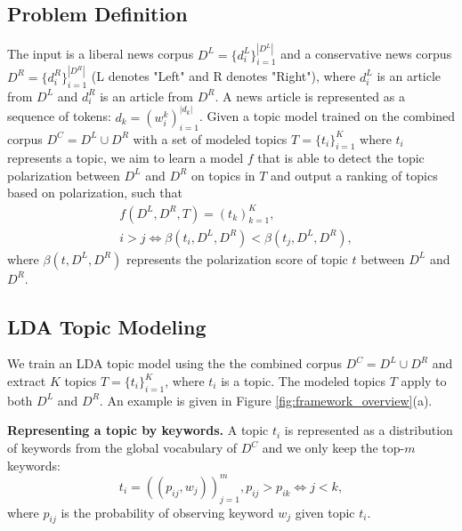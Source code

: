 \documentclass[11pt]{article}
\begin{document}
\subsection{Problem Definition}
The input is a liberal news corpus $D^L=\{d^L_i\}_{i=1}^{|D^L|}$ and a conservative news corpus $D^R=\{d^R_i\}_{i=1}^{|D^R|}$ (L denotes "Left" and R denotes "Right"), where $d^L_i$ is an article from $D^L$ and $d^R_i$ is an article from $D^R$. A news article is represented as a sequence of tokens: $d_k=(w_i^k)_{i=1}^{|d_k|}$.
Given a topic model trained on the combined corpus $D^C=D^L \cup D^R$ with a set of modeled topics $T=\{t_i\}_{i=1}^K$ where $t_i$ represents a topic, we aim to learn a model $f$ that is able to detect the topic polarization between $D^L$ and $D^R$ on topics in $T$ and output a ranking of topics based on polarization, such that
\begin{equation}
\begin{aligned}
    & f(D^L, D^R, T)=(t_k)_{k=1}^K,\\
    & i>j \Leftrightarrow \beta(t_i, D^L, D^R)<\beta(t_j, D^L, D^R),
\end{aligned}
\end{equation}
where $\beta(t,D^L,D^R)$ represents the polarization score of topic $t$ between $D^L$ and $D^R$.


\subsection{LDA Topic Modeling}
\label{sec:lda}
We train an LDA topic model using the the combined corpus $D^C=D^L \cup D^R$ and extract $K$ topics $T=\{t_i\}_{i=1}^K$, where $t_i$ is a topic. The modeled topics $T$ apply to both $D^L$ and $D^R$. An example is given in Figure \ref{fig:framework_overview}(a).

\textbf{Representing a topic by keywords.} A topic $t_i$ is represented as a distribution of keywords from the global vocabulary of $D^C$ and we only keep the top-$m$ keywords:
\begin{equation}
\label{eq:topic2keyword}
    t_i = ((p_{ij}, w_j))_{j=1}^{m}, p_{ij}>p_{ik} \Leftrightarrow j<k,
\end{equation}
where $p_{ij}$ is the probability of observing keyword $w_j$ given topic $t_i$.
\end{document}
